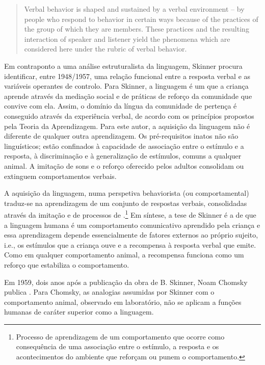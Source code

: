 \documentclass[output=paper]{LSP/langsci}
\begin{document}
\begin{quote}
Verbal behavior is shaped and sustained by a verbal environment -- by people who respond to behavior in certain ways because of the practices of the group of which they are members. These practices and the resulting interaction of speaker and listener yield the phenomena which are considered here under the rubric of verbal behavior. \citep[226]{skinner57}
\end{quote}

Em contraponto a uma análise estruturalista da linguagem, Skinner procura identificar, entre 1948/1957, uma relação funcional entre a resposta verbal e as variáveis operantes de controlo. Para Skinner, a linguagem é um  que a criança aprende através da mediação social e de práticas de reforço da comunidade que convive com ela. Assim, o domínio da língua da comunidade de pertença é conseguido através da experiência verbal, de acordo com os princípios propostos pela Teoria da Aprendizagem. Para este autor, a aquisição da linguagem não é diferente de qualquer outra aprendizagem. Os pré-requisitos inatos não são linguísticos; estão confinados à capacidade de associação entre o estímulo e a resposta, à discriminação e à generalização de estímulos, comuns a qualquer animal. A imitação de sons e o reforço oferecido pelos adultos consolidam ou extinguem comportamentos verbais.

A aquisição da linguagem, numa perspetiva behaviorista (ou comportamental) traduz-se na aprendizagem de um conjunto de respostas verbais, consolidadas através da imitação e de processos de .\footnote{Processo de aprendizagem de um comportamento que ocorre como consequência de uma associação entre o estímulo, a resposta e os acontecimentos do ambiente que reforçam ou punem o comportamento.} Em síntese, a tese de Skinner é a de que a linguagem humana é um comportamento comunicativo aprendido pela criança e essa aprendizagem depende essencialmente de fatores externos ao próprio sujeito, i.e., os estímulos que a criança ouve e a recompensa à resposta verbal que emite. Como em qualquer comportamento animal, a recompensa funciona como um reforço que estabiliza o comportamento. 

Em 1959, dois anos após a publicação da obra  de B. Skinner, Noam Chomsky publica . Para Chomsky, as analogias assumidas por Skinner com o comportamento animal, observado em laboratório, não se aplicam a funções humanas de caráter superior como a linguagem.
\end{document}
